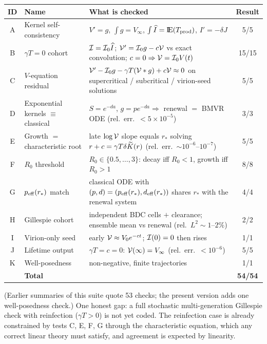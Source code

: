 \begin{center}
\renewcommand{\arraystretch}{1.2}
\small
\begin{tabular}{@{}clp{}c@{}}
\toprule
ID & Name & What is checked & Result \\
\midrule
A & Kernel self-consistency &
  $V'=g$, $\int g=V_\infty$, $\int\widehat{I}={\rm I}\!{\rm E}(T_{\rm prod})$, $I'=-\delta J$ &
  5/5 \\
B & $\gamma T=0$ cohort &
  $\mathcal{I}=\mathcal{I}_0\widehat{I}$; $\mathcal{V}'=\mathcal{I}_0 g-c\mathcal{V}$ vs exact
  convolution; $c=0\Rightarrow\mathcal{V}=\mathcal{I}_0 V(t)$ &
  15/15 \\
C & $V$-equation residual &
  $\mathcal{V}'-\mathcal{I}_0 g-\gamma T(\mathcal{V}*g)+c\mathcal{V}\approx0$ on
  supercritical / subcritical / virion-seed solutions &
  5/5 \\
D & Exponential kernels $\equiv$ classical &
  $S=e^{-da}$, $g=pe^{-da}\Rightarrow$ renewal $=$ BMVR ODE
  (rel.\ err.\ $<5\times10^{-5}$) &
  3/3 \\
E & Growth $=$ characteristic root &
  late $\log\mathcal{V}$ slope equals $r_*$ solving $r+c=\gamma T\delta\widetilde{K}(r)$
  (rel.\ err.\ $\sim10^{-6}$--$10^{-7}$) &
  5/5 \\
F & $R_0$ threshold &
  $R_0\in\{0.5,\ldots,3\}$: decay iff $R_0<1$, growth iff $R_0>1$ &
  8/8 \\
G & $p_{\rm eff}(r_*)$ match &
  classical ODE with $(p,d)=(p_{\rm eff}(r_*),d_{\rm eff}(r_*))$ shares
  $r_*$ with the renewal system &
  4/4 \\
H & Gillespie cohort &
  independent BDC cells $+$ clearance; ensemble mean vs renewal
  (rel.\ $L^2\sim1$--$2\%$) &
  2/2 \\
I & Virion-only seed &
  early $\mathcal{V}\approx V_0e^{-ct}$; $\mathcal{I}(0)=0$ then rises &
  1/1 \\
J & Lifetime output &
  $\gamma T=c=0$: $\mathcal{V}(\infty)=V_\infty$ (rel.\ err.\ $<10^{-6}$) &
  5/5 \\
K & Well-posedness &
  non-negative, finite trajectories &
  1/1 \\
\midrule
 & \textbf{Total} & & \textbf{54/54} \\
\bottomrule
\end{tabular}
\end{center}
(Earlier summaries of this suite quote 53 checks; the present version adds
one well-posedness check.) One honest gap: a full stochastic
multi-generation Gillespie check with reinfection ($\gamma T>0$) is not yet
coded. The reinfection case is already constrained by tests C, E, F, G
through the characteristic equation, which any correct linear theory must
satisfy, and agreement is expected by linearity.

